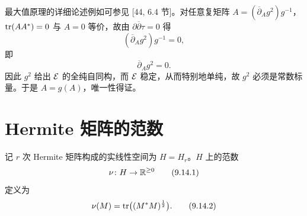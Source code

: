 最大值原理的详细论述例如可参见 [44, 6.4 节]。对任意复矩阵 $A=(\overline{\partial}_Ag^2)g^{-1}$，$\operatorname{tr}(AA^*)=0$ 与 $A=0$ 等价，故由 $\partial\overline{\partial}\tau=0$ 得
\begin{equation}
  (\overline{\partial}_Ag^2)g^{-1}=0,
  \tag{9.13.20}
\end{equation}
即
\begin{equation}
  \overline{\partial}_Ag^2=0.
  \tag{9.13.21}
\end{equation}
因此 $g^2$ 给出 $\mathcal{E}$ 的全纯自同构，而 $\mathcal{E}$ 稳定，从而特别地单纯，故 $g^2$ 必须是常数标量。于是 $A=g(A)$，唯一性得证。

\section{Hermite 矩阵的范数}

记 $r$ 次 Hermite 矩阵构成的实线性空间为 $H=H_r$。$H$ 上的范数
\begin{equation}
  \nu\colon H\to\mathbb{R}^{\ge0}
  \tag{9.14.1}
\end{equation}
定义为
\begin{equation}
  \nu(M)=\operatorname{tr}\bigl((M^*M)^{\frac12}\bigr).
  \tag{9.14.2}
\end{equation}

